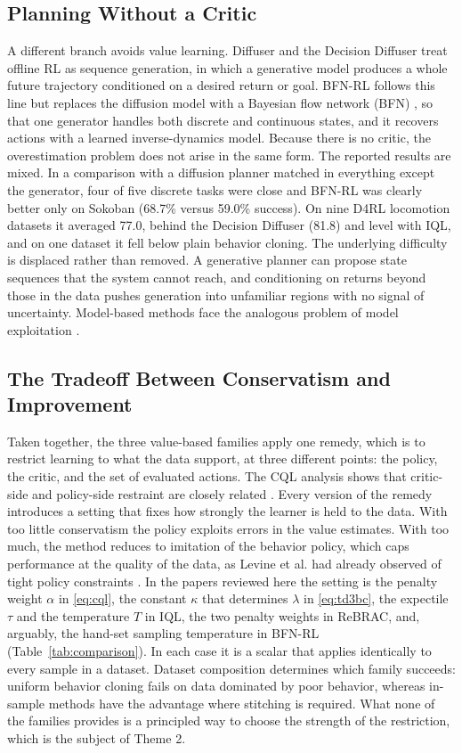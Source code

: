 \documentclass[journal]{IEEEtran}
\begin{document}
\subsection{Planning Without a Critic}
A different branch avoids value learning. Diffuser \cite{janner2022diffuser} and the Decision Diffuser \cite{ajay2023decisiondiffuser} treat offline RL as sequence generation, in which a generative model produces a whole future trajectory conditioned on a desired return or goal. BFN-RL \cite{killingberg2026bfn} follows this line but replaces the diffusion model with a Bayesian flow network (BFN) \cite{graves2023bfn}, so that one generator handles both discrete and continuous states, and it recovers actions with a learned inverse-dynamics model. Because there is no critic, the overestimation problem does not arise in the same form. The reported results are mixed. In a comparison with a diffusion planner matched in everything except the generator, four of five discrete tasks were close and BFN-RL was clearly better only on Sokoban (68.7\% versus 59.0\% success). On nine D4RL locomotion datasets it averaged 77.0, behind the Decision Diffuser (81.8) and level with IQL, and on one dataset it fell below plain behavior cloning. The underlying difficulty is displaced rather than removed. A generative planner can propose state sequences that the system cannot reach, and conditioning on returns beyond those in the data pushes generation into unfamiliar regions with no signal of uncertainty. Model-based methods face the analogous problem of model exploitation \cite{he2023survey}.

\subsection{The Tradeoff Between Conservatism and Improvement}
Taken together, the three value-based families apply one remedy, which is to restrict learning to what the data support, at three different points: the policy, the critic, and the set of evaluated actions. The CQL analysis shows that critic-side and policy-side restraint are closely related \cite{kumar2020cql}. Every version of the remedy introduces a setting that fixes how strongly the learner is held to the data. With too little conservatism the policy exploits errors in the value estimates. With too much, the method reduces to imitation of the behavior policy, which caps performance at the quality of the data, as Levine et al. had already observed of tight policy constraints \cite{levine2020tutorial}. In the papers reviewed here the setting is the penalty weight $\alpha$ in \eqref{eq:cql}, the constant $\kappa$ that determines $\lambda$ in \eqref{eq:td3bc}, the expectile $\tau$ and the temperature $T$ in IQL, the two penalty weights in ReBRAC, and, arguably, the hand-set sampling temperature in BFN-RL (Table~\ref{tab:comparison}). In each case it is a scalar that applies identically to every sample in a dataset. Dataset composition determines which family succeeds: uniform behavior cloning fails on data dominated by poor behavior, whereas in-sample methods have the advantage where stitching is required. What none of the families provides is a principled way to choose the strength of the restriction, which is the subject of Theme 2.
\end{document}
